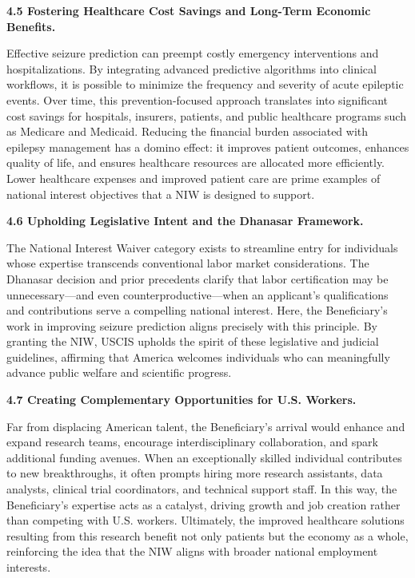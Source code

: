 \documentclass{article}
\begin{document}
{\bf 4.5 Fostering Healthcare Cost Savings and Long-Term Economic Benefits.}

Effective seizure prediction can preempt costly emergency interventions and hospitalizations. By integrating advanced predictive algorithms into clinical workflows, it is possible to minimize the frequency and severity of acute epileptic events. Over time, this prevention-focused approach translates into significant cost savings for hospitals, insurers, patients, and public healthcare programs such as Medicare and Medicaid. Reducing the financial burden associated with epilepsy management has a domino effect: it improves patient outcomes, enhances quality of life, and ensures healthcare resources are allocated more efficiently. Lower healthcare expenses and improved patient care are prime examples of national interest objectives that a NIW is designed to support.


{\bf 4.6 Upholding Legislative Intent and the Dhanasar Framework.}

The National Interest Waiver category exists to streamline entry for individuals whose expertise transcends conventional labor market considerations. The Dhanasar decision and prior precedents clarify that labor certification may be unnecessary—and even counterproductive—when an applicant’s qualifications and contributions serve a compelling national interest. Here, the Beneficiary’s work in improving seizure prediction aligns precisely with this principle. By granting the NIW, USCIS upholds the spirit of these legislative and judicial guidelines, affirming that America welcomes individuals who can meaningfully advance public welfare and scientific progress.

{\bf 4.7 Creating Complementary Opportunities for U.S. Workers.}

Far from displacing American talent, the Beneficiary’s arrival would enhance and expand research teams, encourage interdisciplinary collaboration, and spark additional funding avenues. When an exceptionally skilled individual contributes to new breakthroughs, it often prompts hiring more research assistants, data analysts, clinical trial coordinators, and technical support staff. In this way, the Beneficiary’s expertise acts as a catalyst, driving growth and job creation rather than competing with U.S. workers. Ultimately, the improved healthcare solutions resulting from this research benefit not only patients but the economy as a whole, reinforcing the idea that the NIW aligns with broader national employment interests.
\end{document}
